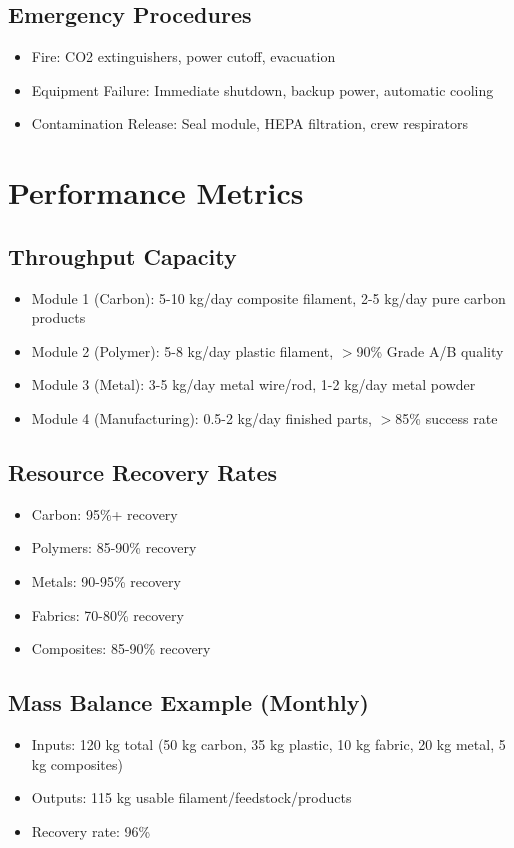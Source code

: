 \documentclass[12pt, a4paper]{article}
\begin{document}
\subsection{Emergency Procedures}
\begin{itemize}
    \item Fire: CO2 extinguishers, power cutoff, evacuation
    \item Equipment Failure: Immediate shutdown, backup power, automatic cooling
    \item Contamination Release: Seal module, HEPA filtration, crew respirators
\end{itemize}

\section{Performance Metrics}

\subsection{Throughput Capacity}
\begin{itemize}
    \item Module 1 (Carbon): 5-10 kg/day composite filament, 2-5 kg/day pure carbon products
    \item Module 2 (Polymer): 5-8 kg/day plastic filament, $>$90\% Grade A/B quality
    \item Module 3 (Metal): 3-5 kg/day metal wire/rod, 1-2 kg/day metal powder
    \item Module 4 (Manufacturing): 0.5-2 kg/day finished parts, $>$85\% success rate
\end{itemize}

\subsection{Resource Recovery Rates}
\begin{itemize}
    \item Carbon: 95\%+ recovery
    \item Polymers: 85-90\% recovery
    \item Metals: 90-95\% recovery
    \item Fabrics: 70-80\% recovery
    \item Composites: 85-90\% recovery
\end{itemize}

\subsection{Mass Balance Example (Monthly)}
\begin{itemize}
    \item Inputs: 120 kg total (50 kg carbon, 35 kg plastic, 10 kg fabric, 20 kg metal, 5 kg composites)
    \item Outputs: 115 kg usable filament/feedstock/products
    \item Recovery rate: 96\%
\end{itemize}
\end{document}
